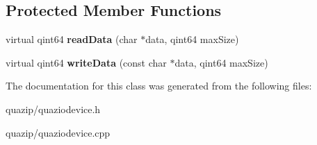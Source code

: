 \subsection*{Protected Member Functions}
\begin{DoxyCompactItemize}
\item 
virtual qint64 {\bfseries readData} (char $\ast$data, qint64 maxSize)\label{classQuaZIODevice_aa12b8bc9c923e543eda9ae22dbd1ecbb}

\item 
virtual qint64 {\bfseries writeData} (const char $\ast$data, qint64 maxSize)\label{classQuaZIODevice_aab23b6badbc3548eb71ca86bf6211902}

\end{DoxyCompactItemize}


The documentation for this class was generated from the following files:\begin{DoxyCompactItemize}
\item 
quazip/quaziodevice.h\item 
quazip/quaziodevice.cpp\end{DoxyCompactItemize}
